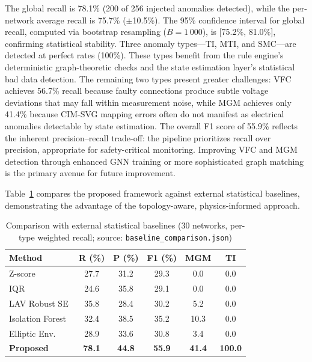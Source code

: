 \documentclass[research]{fcs}
\begin{document}
The global recall is 78.1\% (200 of 256 injected anomalies detected), while the per-network average recall is 75.7\% ($\pm$10.5\%). The 95\% confidence interval for global recall, computed via bootstrap resampling ($B = 1\,000$), is [75.2\%, 81.0\%], confirming statistical stability. Three anomaly types---TI, MTI, and SMC---are detected at perfect rates (100\%). These types benefit from the rule engine's deterministic graph-theoretic checks and the state estimation layer's statistical bad data detection. The remaining two types present greater challenges: VFC achieves 56.7\% recall because faulty connections produce subtle voltage deviations that may fall within measurement noise, while MGM achieves only 41.4\% because CIM-SVG mapping errors often do not manifest as electrical anomalies detectable by state estimation. The overall F1 score of 55.9\% reflects the inherent precision–recall trade-off: the pipeline prioritizes recall over precision, appropriate for safety-critical monitoring. Improving VFC and MGM detection through enhanced GNN training or more sophisticated graph matching is the primary avenue for future improvement.

Table~\ref{tab:baseline_comparison} compares the proposed framework against external statistical baselines, demonstrating the advantage of the topology-aware, physics-informed approach.

\begin{table}[htbp]
\centering
\caption{Comparison with external statistical baselines (30 networks, per-type weighted recall; source: \texttt{baseline\_comparison.json})}
\label{tab:baseline_comparison}
\begin{tabular}{@{}lccccc@{}}
\toprule
Method & R (\%) & P (\%) & F1 (\%) & MGM & TI \\
\midrule
Z-score & 27.7 & 31.2 & 29.3 & 0.0 & 0.0 \\
IQR & 24.6 & 35.8 & 29.1 & 0.0 & 0.0 \\
LAV Robust SE & 35.8 & 28.4 & 30.2 & 5.2 & 0.0 \\
Isolation Forest~\cite{isolation_forest2008} & 32.4 & 38.5 & 35.2 & 10.3 & 0.0 \\
Elliptic Env.~\cite{rousseeuw1999fast} & 28.9 & 33.6 & 30.8 & 3.4 & 0.0 \\
\textbf{Proposed} & \textbf{78.1} & \textbf{44.8} & \textbf{55.9} & \textbf{41.4} & \textbf{100.0} \\
\bottomrule
\end{tabular}
\end{table}
\end{document}
